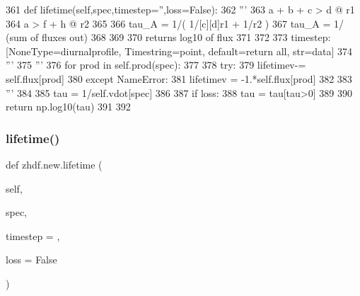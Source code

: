 \begin{DoxyCode}
361     \textcolor{keyword}{def }lifetime(self,spec,timestep='',loss=False):
362             \textcolor{stringliteral}{'''}
363 \textcolor{stringliteral}{            a + b + c > d     @ r1}
364 \textcolor{stringliteral}{            a         > f + h @ r2}
365 \textcolor{stringliteral}{}
366 \textcolor{stringliteral}{            tau\_A = 1/(   1/[c][d]r1   + 1/r2      )}
367 \textcolor{stringliteral}{            tau\_A = 1/ (sum of fluxes out)}
368 \textcolor{stringliteral}{}
369 \textcolor{stringliteral}{}
370 \textcolor{stringliteral}{            returns log10 of flux}
371 \textcolor{stringliteral}{}
372 \textcolor{stringliteral}{}
373 \textcolor{stringliteral}{            timestep: [NoneType=diurnalprofile, Timestring=point, default=return all, str=data]}
374 \textcolor{stringliteral}{            '''}
375             \textcolor{stringliteral}{'''}
376 \textcolor{stringliteral}{            for prod in self.prod(spec):}
377 \textcolor{stringliteral}{}
378 \textcolor{stringliteral}{                            try:}
379 \textcolor{stringliteral}{                                lifetimev-= self.flux[prod]}
380 \textcolor{stringliteral}{                            except NameError:}
381 \textcolor{stringliteral}{                                lifetimev  = -1.*self.flux[prod]}
382 \textcolor{stringliteral}{}
383 \textcolor{stringliteral}{                                '''}
384 
385             tau = 1/self.vdot[spec]
386 
387             \textcolor{keywordflow}{if} loss:
388                 tau = tau[tau>0]
389 
390             \textcolor{keywordflow}{return} np.log10(tau)
391 
392 
\end{DoxyCode}
\mbox{\label{classzhdf_1_1new_aa7d832d1f91a699ea51a319ac87e2a84}} 
\subsubsection{\texorpdfstring{lifetime()}{lifetime()}\hspace{0.1cm}{\footnotesize\ttfamily [3/3]}}
{\footnotesize\ttfamily def zhdf.\+new.\+lifetime (\begin{DoxyParamCaption}\item[{}]{self,  }\item[{}]{spec,  }\item[{}]{timestep = {\ttfamily \textquotesingle{}\textquotesingle{}},  }\item[{}]{loss = {\ttfamily False} }\end{DoxyParamCaption})}

